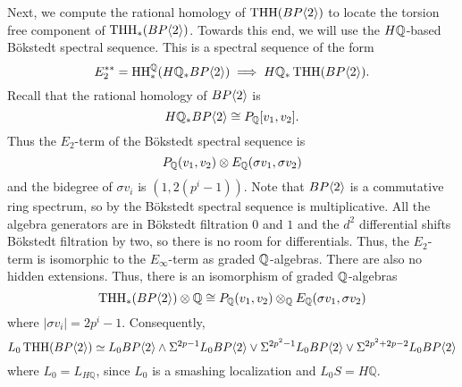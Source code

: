 Next, we compute the rational homology of $\operatorname{THH}(BP\langle 2 \rangle)$ to locate the torsion free component of $\operatorname{THH}_*(BP\langle 2 \rangle)$. Towards this end, we will use the $H\mathbb{Q}$-based B\"okstedt spectral sequence. This is a spectral sequence of the form 
\[
E_2^{**}=\operatorname{HH}_*^{\mathbb{Q}}(H\mathbb{Q}_*BP\langle 2 \rangle)\implies H\mathbb{Q}_*\operatorname{THH}(BP\langle 2 \rangle).
\]
Recall that the rational homology of $BP\langle 2 \rangle$ is  
\[
H\mathbb{Q}_*BP\langle 2 \rangle\cong P_{\mathbb{Q}} [v_1,v_2].
\]
Thus the $E_2$-term of the B\"okstedt spectral sequence is 
\[
P_{\mathbb{Q}}(v_1, v_2)\otimes E_{\mathbb{Q}}( \sigma v_1,\sigma v_2)
\]
and the bidegree of $\sigma v_i$ is $(1,2(p^i-1))$. Note that $BP\langle 2 \rangle$ is a commutative ring spectrum, so by \cite[Prop. 4.3]{AngeltveitRognes} the B\"okstedt spectral sequence is multiplicative. All the algebra generators are in B\"okstedt filtration $0$ and $1$ and the $d^2$ differential shifts B\"okstedt filtration by two, so there is no room for differentials. Thus, the $E_2$-term is isomorphic to the $E_\infty$-term as graded $\mathbb{Q}$-algebras. There are also no hidden extensions. %
Thus, there is an isomorphism of graded $\mathbb{Q}$-algebras
\[
\operatorname{THH}_*(BP\langle 2 \rangle)\otimes \mathbb{Q}\cong P_{\mathbb{Q}}(v_1,v_2)\otimes_{\mathbb{Q}} E_{\mathbb{Q}}(\sigma v_1,\sigma v_2)
\]
where $|\sigma v_i|=2p^i-1$.  Consequently, 
\[ L_0 \operatorname{THH}(BP\langle 2 \rangle)\simeq L_0BP\langle 2 \rangle\wedge \Sigma^{2p-1}L_0BP\langle 2 \rangle\vee \Sigma^{2p^2-1}L_0BP\langle 2 \rangle\vee\Sigma^{2p^2+2p-2}L_0BP\langle 2 \rangle\]
where $L_0=L_{H\mathbb{Q}}$, since $L_0$ is a smashing localization and $L_0S=H\mathbb{Q}$. 

